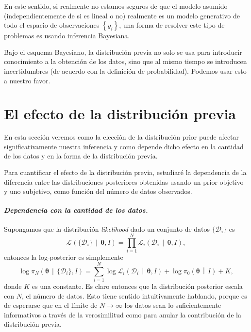\documentclass[a4paper,twoside]{article}
\newcommand{\hip}{\ensuremath{\mathbold{\theta}}\xspace}
\newcommand{\dat}[1][i]{\ensuremath{\{\mathcal{D}_{#1}\}}\xspace}
\newcommand{\pos}[2]{\ensuremath{\pi_N\left(#1\,\middle|\, #2\right)}\xspace}
\newcommand{\pri}[2]{\ensuremath{\pi_0\left(#1\,\middle|\, #2\right)}\xspace}
\newcommand{\lik}[3][]{\ensuremath{\mathcal{L}_{#1}\left(#2\,\middle|\, #3\right)}\xspace}
\newcommand{\set}[1]{\ensuremath{\left\{#1\right\}}\xspace}
\begin{document}
En este sentido, si realmente no estamos seguros de que el modelo asumido (independientemente de si
es lineal o no) realmente es un modelo generativo de todo el espacio de observaciones $\set{y_i}$,
una forma de resolver este tipo de problemas es usando inferencia Bayesiana.

Bajo el esquema Bayesiano, la distribución previa no solo se usa para introducir conocimiento
a la obtención de los datos, sino que al mismo tiempo se introducen incertidumbres (de acuerdo con
la definición de probabilidad). Podemos usar esto a nuestro favor.


\section*{El efecto de la distribución previa}
%
En esta sección veremos como la elección de la distribución prior puede afectar significativamente
nuestra inferencia y como depende dicho efecto en la cantidad de los datos y en la forma de la
distribución previa.

Para cuantificar el efecto de la distribución previa, estudiaré la dependencia de la diferencia
entre las distribuciones posteriores obtenidas usando un prior objetivo y uno subjetivo, como
función del número de datos observados.

\paragraph{\textit{\color{teal}Dependencia con la cantidad de los datos.}} Supongamos que la
distribución \emph{likelihood} dado un conjunto de datos $\dat$ es
%
$$\lik{\dat}{\hip,I} = \prod_{i=1}^N\lik[i]{\mathcal{D}_i}{\hip,I},$$
%
entonces la log-posterior es simplemente
%
$$\log{\pos{\hip}{\dat,I}} = \sum_{i=1}^N\log{\lik[i]{\mathcal{D}_i}{\hip,I}} + \log{\pri{\hip}{I}} + K,$$
%
donde $K$ es una constante. Es claro entonces que la distribución posterior escala con $N$, el
número de datos. Esto tiene sentido intuitivamente hablando, porque es de esperarse que en el límite
de $N\to\infty$ los datos sean lo suficientemente informativos a través de la verosimilitud como
para anular la contribución de la distribución previa.
\end{document}

